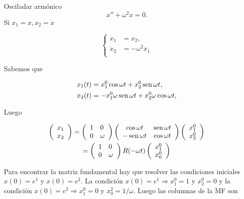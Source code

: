  \begin{ejemplo}{Osciladar armónico}
$$
{x}''+\omega^{2} x=0.
$$
Si $x_{1}=x, x_{2}=\dot{x}$

\begin{equation}\label{eq:osc_arm_eq}
\left\{
\begin{split}
\dot{x}_{1}&=x_{2},\\
\dot{x}_2&=-\omega^{2} x_1\\
\end{split}
\right.
\end{equation}

Sabemos que

\begin{align*}
 x_1(t)&=x_1^0\cos \omega t+x_2^0\operatorname{sen}\omega t,\\
 x_2(t)&=- x_1^0\omega\operatorname{sen} \omega t+x_2^0\omega\cos\omega t,
 \end{align*}
 
Luego

\begin{multline*}
\left(\begin{array}{l}
x_{1} \\
x_{2}
\end{array}\right)=
\left(\begin{array}{ll}
1 & 0 \\
0 & \omega
\end{array}\right)
\left(\begin{array}{cc}
\cos \omega t & \operatorname{sen} \omega t \\
-\operatorname{sen} \omega t & \cos \omega t
\end{array}\right) \left(\begin{array}{l}
x_{1}^{0} \\
x_{2}^{0}
\end{array}\right)\\
=\left(\begin{array}{ll}
1 & 0 \\
0 & \omega
\end{array}\right)   R(-\omega t)\left(\begin{array}{l}
x_{1}^{0} \\
x_{0}^{0}
\end{array}\right)
\end{multline*}

Para encontrar la matriz fundamental hay que resolver las condiciones iniciales \(x(0)=e^{1}\)  y \(x(0)=e^{2}\). La condición $x(0)=e^1 \Rightarrow x_{1}^{0}=1$ y $x_{2}^{0}=0$ y la condición
$x(0)=e^{2} \Rightarrow x_1^0=0$ y $x_0^{2}=1 / \omega$. Luego las columnas de la MF son


\end{ejemplo}
